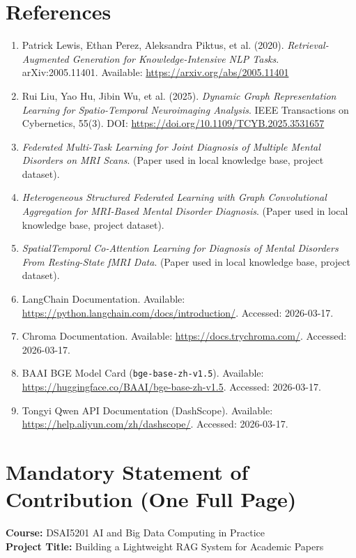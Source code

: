 \documentclass[11pt,a4paper]{article}
\begin{document}
\section*{References}
\begin{enumerate}[leftmargin=1.4em]
  \item Patrick Lewis, Ethan Perez, Aleksandra Piktus, et al. (2020). \textit{Retrieval-Augmented Generation for Knowledge-Intensive NLP Tasks}. arXiv:2005.11401. Available: \url{https://arxiv.org/abs/2005.11401}
  \item Rui Liu, Yao Hu, Jibin Wu, et al. (2025). \textit{Dynamic Graph Representation Learning for Spatio-Temporal Neuroimaging Analysis}. IEEE Transactions on Cybernetics, 55(3). DOI: \url{https://doi.org/10.1109/TCYB.2025.3531657}
  \item \textit{Federated Multi-Task Learning for Joint Diagnosis of Multiple Mental Disorders on MRI Scans}. (Paper used in local knowledge base, project dataset).
  \item \textit{Heterogeneous Structured Federated Learning with Graph Convolutional Aggregation for MRI-Based Mental Disorder Diagnosis}. (Paper used in local knowledge base, project dataset).
  \item \textit{SpatialTemporal Co-Attention Learning for Diagnosis of Mental Disorders From Resting-State fMRI Data}. (Paper used in local knowledge base, project dataset).
  \item LangChain Documentation. Available: \url{https://python.langchain.com/docs/introduction/}. Accessed: 2026-03-17.
  \item Chroma Documentation. Available: \url{https://docs.trychroma.com/}. Accessed: 2026-03-17.
  \item BAAI BGE Model Card (\texttt{bge-base-zh-v1.5}). Available: \url{https://huggingface.co/BAAI/bge-base-zh-v1.5}. Accessed: 2026-03-17.
  \item Tongyi Qwen API Documentation (DashScope). Available: \url{https://help.aliyun.com/zh/dashscope/}. Accessed: 2026-03-17.
\end{enumerate}

\newpage
\section*{Mandatory Statement of Contribution (One Full Page)}
\textbf{Course:} DSAI5201 AI and Big Data Computing in Practice \\
\textbf{Project Title:} Building a Lightweight RAG System for Academic Papers
\end{document}

